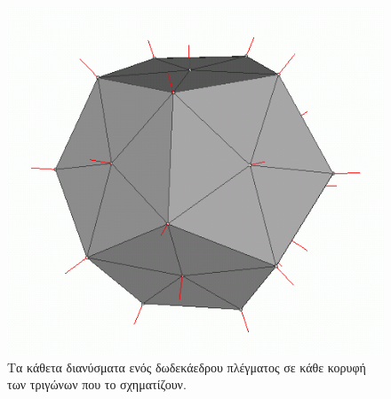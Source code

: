 \begin{definition}
\begin{figure}[h]
\label{fig:vertex_normal_reflection}	
\centering
\includegraphics[scale=0.2]{images/appendix/vertex_normal.png}
\caption[Αντανάκλαση του φωτός στο κάθετο διάνυσμα]{Τα κάθετα διανύσματα ενός δωδεκάεδρου πλέγματος σε κάθε κορυφή των τριγώνων που το σχηματίζουν.}
\end{figure}

\end{definition}
